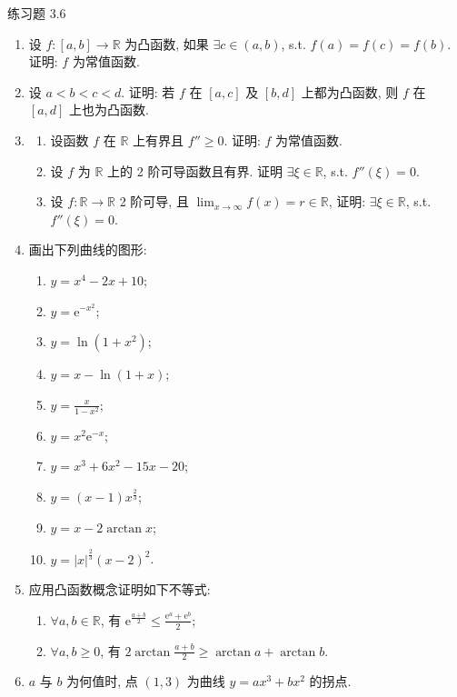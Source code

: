 \begin{exblock}{练习题 3.6}
\begin{enumerate}
  \item 设 $f:[a,b]\to\mathbb{R}$ 为凸函数, 如果 $\exists c\in(a,b)$, s.t. $f(a)=f(c)=f(b)$. 证明: $f$ 为常值函数.

  \item 设 $a<b<c<d$. 证明: 若 $f$ 在 $[a,c]$ 及 $[b,d]$ 上都为凸函数, 则 $f$ 在 $[a,d]$ 上也为凸函数.

  \item \begin{enumerate}[label=(\arabic*)]
    \item 设函数 $f$ 在 $\mathbb{R}$ 上有界且 $f''\geqslant 0$. 证明: $f$ 为常值函数.
    \item 设 $f$ 为 $\mathbb{R}$ 上的 2 阶可导函数且有界. 证明 $\exists \xi\in\mathbb{R}$, s.t. $f''(\xi)=0$.
    \item 设 $f:\mathbb{R}\to\mathbb{R}$ 2 阶可导, 且 $\lim_{x\to\infty}f(x)=r\in\mathbb{R}$, 证明: $\exists \xi\in\mathbb{R}$, s.t. $f''(\xi)=0$.
  \end{enumerate}

  \item 画出下列曲线的图形:
  \begin{enumerate}[label=(\arabic*)]
    \item $y=x^{4}-2x+10$;
    \item $y=\mathrm{e}^{-x^2}$;
    \item $y=\ln(1+x^2)$;
    \item $y=x-\ln(1+x)$;
    \item $y=\frac{x}{1-x^2}$;
    \item $y=x^{2}\mathrm{e}^{-x}$;
    \item $y=x^{3}+6x^{2}-15x-20$;
    \item $y=(x-1)x^{\frac{2}{3}}$;
    \item $y=x-2\arctan x$;
    \item $y=|x|^{\frac{2}{3}}(x-2)^{2}$.
  \end{enumerate}

  \item 应用凸函数概念证明如下不等式:
  \begin{enumerate}[label=(\arabic*)]
    \item $\forall a,b\in\mathbb{R}$, 有 $\mathrm{e}^{\frac{a+b}{2}}\leqslant\frac{\mathrm{e}^{a}+\mathrm{e}^{b}}{2}$;
    \item $\forall a,b\geqslant 0$, 有 $2\arctan\frac{a+b}{2}\geqslant\arctan a+\arctan b$.
  \end{enumerate}

  \item $a$ 与 $b$ 为何值时, 点 $(1,3)$ 为曲线 $y=ax^{3}+bx^{2}$ 的拐点.


\end{enumerate}
\end{exblock}
